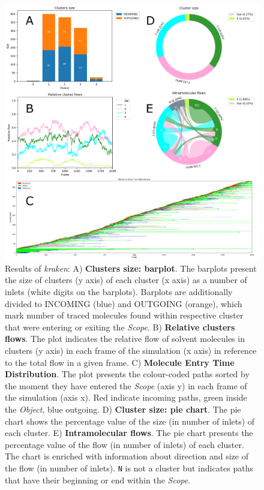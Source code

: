 \documentclass[9pt,tutorial]{livecoms}
\begin{document}
\begin{figure}[hptb!]
\centering
\includegraphics[width=\textwidth]{Tut3.1.png}
\caption{Results of \textit{kraken}: A) \textbf{Clusters size: barplot}. The barplots present the size of clusters (y axis) of each cluster (x axis) as a number of inlets (white digits on the barplots). Barplots are additionally divided to INCOMING (blue) and OUTGOING (orange), which mark number of traced molecules found within respective cluster that were entering or exiting the \textit{Scope}. B) \textbf{Relative clusters flows}. The plot indicates the relative flow of solvent molecules in clusters (y axis) in each frame of the simulation (x axis) in reference to the total flow in a given frame. C) \textbf{Molecule Entry Time Distribution}. The plot presents the colour-coded paths sorted by the moment they have entered the \textit{Scope} (axis y) in each frame of the simulation (axis x). Red indicate incoming paths, green inside the \textit{Object}, blue outgoing. D) \textbf{Cluster size: pie chart}. The pie chart shows the percentage value of the size (in number of inlets) of each cluster. E) \textbf{Intramolecular flows}. The pie chart presents the percentage value of the flow (in number of inlets) of  each cluster. The chart is enriched with information about direction and size of the flow (in number of inlets). \texttt{N} is not a cluster but indicates paths that have their beginning or end within the \emph{Scope}.}
\label{Tut3.1}
\end{figure}
\end{document}

